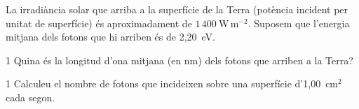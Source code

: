 La irradiància solar que arriba a la superfície de la Terra (potència incident per unitat de superfície) és aproximadament de $1\,400\ \mathrm{W\,m^{-2}}$. Suposem que l'energia mitjana dels fotons que hi arriben és de 2,20~eV.

\begin{apartat}{1}
Quina és la longitud d'ona mitjana (en nm) dels fotons que arriben a la Terra?
\end{apartat}

\begin{apartat}{1}
Calculeu el nombre de fotons que incideixen sobre una superfície d'1,00~cm$^2$ cada segon.
\end{apartat}

